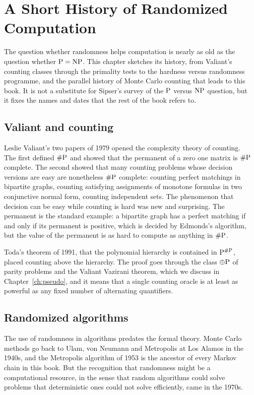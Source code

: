\chapter{A Short History of Randomized Computation}
\label{ch:history}

The question whether randomness helps computation is nearly as old as the question whether $\mathrm{P} = \mathrm{NP}$. This chapter sketches its history, from Valiant's counting classes through the primality tests to the hardness versus randomness programme, and the parallel history of Monte Carlo counting that leads to this book. It is not a substitute for Sipser's survey of the $\mathrm{P}$ versus $\mathrm{NP}$ question, but it fixes the names and dates that the rest of the book refers to.

\section{Valiant and counting}

Leslie Valiant's two papers of 1979 opened the complexity theory of counting. The first defined $\#\mathrm{P}$ and showed that the permanent of a zero one matrix is $\#\mathrm{P}$ complete. The second showed that many counting problems whose decision versions are easy are nonetheless $\#\mathrm{P}$ complete: counting perfect matchings in bipartite graphs, counting satisfying assignments of monotone formulas in two conjunctive normal form, counting independent sets. The phenomenon that decision can be easy while counting is hard was new and surprising. The permanent is the standard example: a bipartite graph has a perfect matching if and only if its permanent is positive, which is decided by Edmonds's algorithm, but the value of the permanent is as hard to compute as anything in $\#\mathrm{P}$.

Toda's theorem of 1991, that the polynomial hierarchy is contained in $\mathrm{P}^{\#\mathrm{P}}$, placed counting above the hierarchy. The proof goes through the class $\oplus\mathrm{P}$ of parity problems and the Valiant Vazirani theorem, which we discuss in Chapter~\ref{ch:pseudo}, and it means that a single counting oracle is at least as powerful as any fixed number of alternating quantifiers.

\section{Randomized algorithms}

The use of randomness in algorithms predates the formal theory. Monte Carlo methods go back to Ulam, von Neumann and Metropolis at Los Alamos in the 1940s, and the Metropolis algorithm of 1953 is the ancestor of every Markov chain in this book. But the recognition that randomness might be a computational resource, in the sense that random algorithms could solve problems that deterministic ones could not solve efficiently, came in the 1970s.

